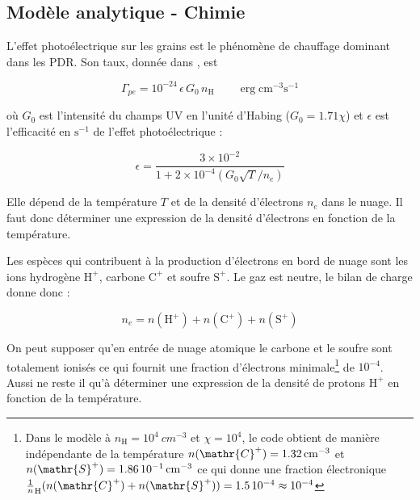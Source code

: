 \subsection{Modèle analytique - Chimie}

L'effet photoélectrique sur les grains est le phénomène de chauffage dominant dans les PDR. Son taux, donnée dans \cite{BakesTielens1994}, est 

\begin{equation}
    \Gamma_{pe} = 10^{-24}\,\epsilon\,G_0\, n_{\mathrm{H}} \qquad \operatorname{erg} \mathrm{cm}^{-3} \mathrm{s}^{-1}
\end{equation} 

où $G_0$ est l'intensité du champs UV en l'unité d'Habing ($G_0 = 1.71\chi$) et $\epsilon$ est l'efficacité en $\mathrm{s}^{-1}$ de l'effet photoélectrique : 

\begin{equation}
    \epsilon = \frac{ 3\times 10^{-2}}{1 +  2\times 10^{-4}(G_0\sqrt{T}/n_e)}
\end{equation}

Elle dépend de la température $T$ et de la densité d'électrons $n_e$ dans le nuage. Il faut donc déterminer une expression de la densité d'électrons en fonction de la température. \newline 

Les espèces qui contribuent à la production d'électrons en bord de nuage sont les ions hydrogène $\mathrm{H}^+$, carbone $\mathrm{C}^+$ et soufre $\mathrm{S}^+$. Le gaz est neutre, le bilan de charge donne donc :

\begin{equation}
    n_e = n(\mathrm{H}^+) + n(\mathrm{C}^+) + n(\mathrm{S}^+)
    \label{eq:bilan:ne}
\end{equation}


On peut supposer qu'en entrée de nuage atomique le carbone et le soufre sont totalement ionisés ce qui fournit une fraction d'électrons minimale\footnote{Dans le modèle à $n_{\mathrm{H}} = 10^4\ cm^{-3}$ et $\chi = 10^4$, le code obtient de manière indépendante de la température $n(\mathr{C}^+) = 1.32\,\mathrm{cm}^{-3}$ et $n(\mathr{S}^+) = 1.86\,10^{-1}\,\mathrm{cm}^{-3}$ ce qui donne une fraction électronique $\frac{1}n_\mathrm{H} (n(\mathr{C}^+)+n(\mathr{S}^+) ) = 1.5\,10^{-4} \approx 10^{-4}$ } de $10^{-4}$. Aussi ne reste il qu'à déterminer une expression de la densité de protons $\mathrm{H}^+$ en fonction de la température.

